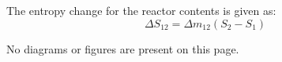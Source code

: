 The entropy change for the reactor contents is given as:  
\[
\Delta S_{12} = \Delta m_{12} \left( S_{2} - S_{1} \right)
\]  

No diagrams or figures are present on this page.